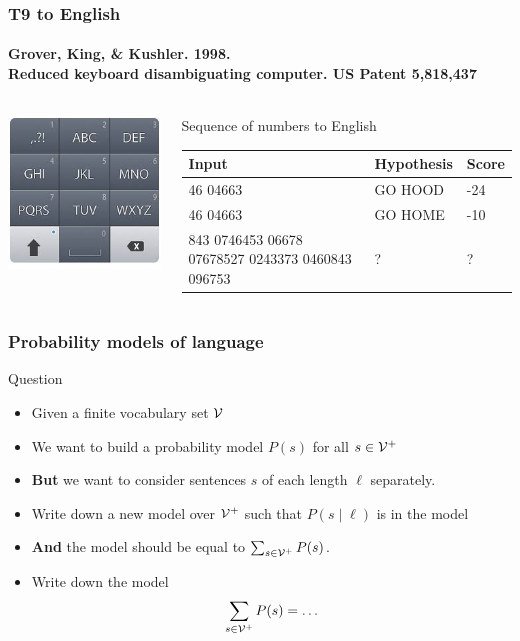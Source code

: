 \begin{frame}
\frametitle{T9 to English}
\framesubtitle{Grover, King, \& Kushler. 1998. \\Reduced keyboard disambiguating computer. US Patent 5,818,437}
\begin{columns}
\begin{column}{0.25\textwidth}
\centering
\includegraphics[scale=.4]{figures/android_t9.jpg}
\end{column}
\begin{column}{0.75\textwidth}  %
\begin{block}{Sequence of numbers to English}
\begin{tabular}{p{3cm}p{3cm}l}
\rowcolor{MidnightBlue!50}
Input & Hypothesis & Score \\
\hline
46 04663 & GO HOOD & -24 \\
46 04663 & GO HOME & -10 \\
843 0746453 06678 07678527 0243373 0460843 096753 & ? & ? \end{tabular} %
\end{block}
\end{column}
\end{columns}

\end{frame}

\begin{frame}
\frametitle{Probability models of language}
\centering
\begin{alertblock}{Question}
\begin{itemize}[<+->]
\item Given a finite vocabulary set ${\cal V}$
\item We want to build a probability model $P(s)$ for all $s \in {\cal V}^+$
\item \textbf{But} we want to consider sentences $s$ of each length $\ell$ separately.
\item Write down a new model over ${\cal V}^+$ such that $P(s \mid \ell)$ is in the model 
\item \textbf{And} the model should be equal to $\sum_{s \in {\cal V}^+} P(s)$.
\item Write down the model
\[ \sum_{s \in {\cal V}^+} P(s) = \ldots \]
\end{itemize}
\end{alertblock}
\end{frame}


